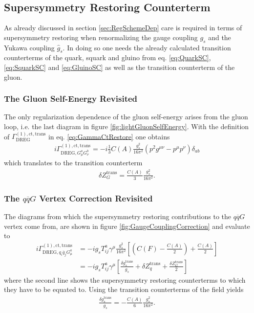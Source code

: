 \subsection{Supersymmetry Restoring Counterterm}\label{sec:SUSYrestore}
As already discussed in section \ref{sec:RegSchemeDep} care is required in terms of supersymmetry restoring when renormalizing  the gauge coupling $g_s$ and the Yukawa coupling $\hat{g}_s$. In doing so one needs the already calculated transition counterterms of the quark, squark and gluino from eq. \eqref{eq:QuarkSC}, \eqref{eq:SquarkSC} and \eqref{eq:GluinoSC}
as well as the transition counterterm of the gluon.
\subsubsection*{The Gluon Self-Energy Revisited}
The only regularization dependence of the gluon self-energy arises from the gluon loop, i.e. the last diagram in figure \ref{fig:lightGluonSelfEnergy}. With the definition of $\Gamma^{\mathrm{(1),ct,trans}}_{\mathrm{DREG}}$ in eq. \eqref{eq:GammaCtRestore} one obtains
\begin{align}
i\Gamma^{\mathrm{(1),ct,trans}}_{\mathrm{DREG},G_\mu^a G_\nu^b} = -i\frac{1}{3} C(A) \frac{g_s^2}{16\pi^2}(p^2 g^{\mu\nu}-p^\mu p^\nu)\delta_{ab}
\end{align}
which translates to the transition counterterm
\begin{align}
\delta Z^{\mathrm{trans}}_G = \frac{C(A)}{3}\frac{g_s^2}{16\pi^2}.
\end{align}

\subsubsection*{The $q\overline{q}G$ Vertex Correction Revisited}
The diagrams from which the supersymmetry restoring contributions to the $q\overline{q}G$ vertex come from, are shown in figure \ref{fig:GaugeCouplingCorrection} and evaluate to
\begin{align}
i\Gamma^{\mathrm{(1),ct,trans}}_{\mathrm{DREG}, q_i\overline{q}_jG_\mu^a} &= -ig_s T^a_{ij} \gamma^\mu \frac{g_s^2}{16\pi^2}\left[ \left( C(F) - \frac{C(A)}{2} \right) + \frac{C(A)}{2} \right]\\
&= -ig_s T^a_{ij} \gamma^\mu \left[ \frac{\delta g_s^{\mathrm{trans}}}{g_s} + \delta Z^{\mathrm{trans}}_q + \frac{\delta Z^{\mathrm{trans}}_G}{2} \right]
\end{align}
where the second line shows the supersymmetry restoring counterterms to which they have to be equated to. Using the transition counterterms of the field yields
\begin{align}
\frac{\delta g_s^{\mathrm{trans}}}{g_s} = -\frac{C(A)}{6} \frac{g_s^2}{16\pi^2}.
\end{align}

